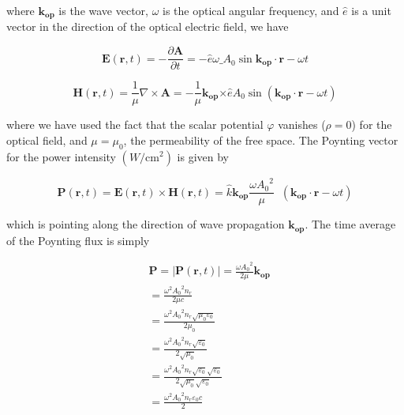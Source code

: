 where $\bm{k_{op}}$ is the wave vector, $\omega$ is the optical angular frequency, and $\hat{e}$ is a unit vector in the direction of the optical electric field, we have

\begin{equation}
  \bm{E}(\bm{r},t) = -\frac{\partial\bm{A}}{\partial{t}}= -\hat{e}\omega{\bm_{A}}_0\sin{\bm{k_{op}}\cdot\bm{r}-\omega{t}}
\end{equation}

\begin{equation}
  \bm{H}\left( \bm{r,}t \right) = \frac{1}{\mu}\nabla \times \bm{A} = - \frac{1}{\mu}\bm{k_{\bm{\text{op}}}}\bm{\times}\hat{e}A_{0}\sin\left( \bm{k}_{\bm{\text{op}}} \cdot \bm{r} - \omega t \right)
\end{equation}

where we have used the fact that the scalar potential \(\varphi\)
vanishes (\(\rho = 0\)) for the optical field, and \(\mu = \mu_{0}\), the
permeability of the free space. The Poynting vector for the power
intensity \((W/\text{cm}^{2})\) is given by

\begin{equation}
  \bm{P}\left( \bm{r,}t \right) = \bm{E}\left( \bm{r,}t \right) \times \bm{H}\left( \bm{r,}t \right) = \hat{k}\bm{k}_{\bm{\text{op}}}\frac{\omega{A_{0}}^{2}}{\mu}\operatorname{}\left( \bm{k}_{\bm{\text{op}}} \cdot \bm{r} - \omega t \right)
\end{equation}

which is pointing along the direction of wave propagation
\(\bm{k}_{\bm{\text{op}}}\). The time average of the Poynting
flux is simply

\begin{eqnarray}
& \bm{P} = \left| \bm{P}\left( \bm{r,}t \right) \right| = \frac{\omega{A_{0}}^{2}}{2\mu}\bm{k}_{\bm{\text{op}}} \nonumber \\
& = \frac{\omega^{2}{A_{0}}^{2}n_{r}}{2\mu{c}} \nonumber \\
& = \frac{\omega^{2}{A_{0}}^{2}n_{r}\sqrt{\mu_{0}\varepsilon_{0}}}{2\mu_{0}} \nonumber \\
& = \frac{\omega^{2}{A_{0}}^{2}n_{r}\sqrt{\varepsilon_{0}}}{2\sqrt{\mu_{0}}} \nonumber \\
& = \frac{\omega^{2}{A_{0}}^{2}n_{r}\sqrt{\varepsilon_{0}}\sqrt{\varepsilon_{0}}}{2\sqrt{\mu_{0}}\sqrt{\varepsilon_{0}}} \nonumber \\
& = \frac{\omega^{2}{A_{0}}^{2}n_{r}\varepsilon_{0}c}{2}
\end{eqnarray}

